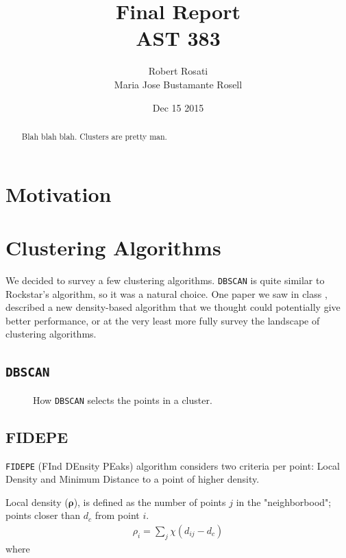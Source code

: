 \documentclass[12pt]{article}
\begin{document}
\singlespacing
\title{Final Report\\
AST 383}
\date{Dec 15 2015}
\author{Robert Rosati \\ Maria Jose Bustamante Rosell}
\maketitle

\begin{abstract}
\par Blah blah blah. Clusters are pretty man.
\end{abstract}

\doublespacing
\section{Motivation}

\section{Clustering Algorithms}
\par We decided to survey a few clustering algorithms. \texttt{DBSCAN} is quite similar to Rockstar's algorithm, so it was a natural choice. One paper we saw in class \cite{FIDEPE}, described a new density-based algorithm that we thought could potentially give better performance, or at the very least more fully survey the landscape of clustering algorithms.

\subsection{\texttt{DBSCAN}}
\begin{figure}[ht]
\centering
\caption{How \texttt{DBSCAN} selects the points in a cluster.}
\label{fig:DBSCAN}
\end{figure}


\subsection{FIDEPE}

\texttt{FIDEPE} (FInd DEnsity PEaks) algorithm \cite{FIDEPE} considers two criteria per point: Local Density and Minimum Distance to a point of higher density.

Local density ($\boldsymbol{\rho}$), is defined as the number of points $j$ in the "neighborbood"; points closer than $d_c$ from point $i$.
\begin{align*}
	\rho_i = \sum_j \chi(d_{ij}-d_c)
\end{align*}
 where 
\end{document}
